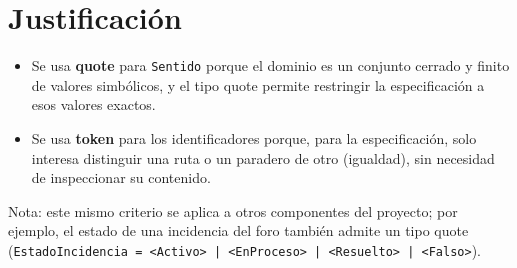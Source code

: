 \documentclass[11pt,a4paper]{article}
\begin{document}
\section{Justificación}

\begin{itemize}
  \item Se usa \textbf{quote} para \texttt{Sentido} porque el dominio es un conjunto cerrado y finito de valores simbólicos, y el tipo quote permite restringir la especificación a esos valores exactos.
  \item Se usa \textbf{token} para los identificadores porque, para la especificación, solo interesa distinguir una ruta o un paradero de otro (igualdad), sin necesidad de inspeccionar su contenido.
\end{itemize}

Nota: este mismo criterio se aplica a otros componentes del proyecto; por ejemplo, el estado de una incidencia del foro también admite un tipo quote (\texttt{EstadoIncidencia = <Activo> | <EnProceso> | <Resuelto> | <Falso>}).
\end{document}
